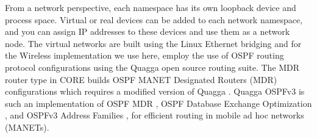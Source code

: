 From a network perspective,  each namespace has its own loopback device and process space. Virtual or real devices can be added to each network namespace, and you can assign IP addresses to these devices and use them as a network node.  The virtual networks are built using the Linux Ethernet bridging and for the Wireless implementation we use here, employ the use of OSPF routing protocol configurations  using the Quagga \cite{quagga} open source routing suite.  The MDR router type in CORE builds OSPF MANET Designated Routers (MDR) configurations which requires a modified version of Quagga \cite{ospf-mdr}.   Quagga OSPFv3 is such an implementation of  OSPF MDR \cite{rfc5614},  OSPF Database Exchange Optimization \cite{rfc5243}, and  OSPFv3 Address Families \cite{rfc5838}, for efficient routing in mobile ad hoc networks (MANETs).

